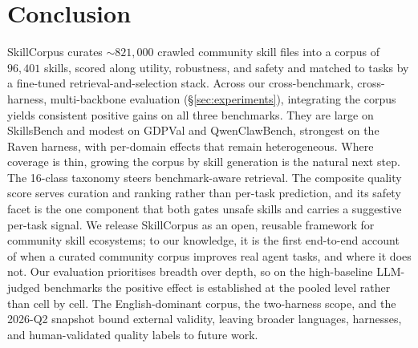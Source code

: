\section{Conclusion}
\label{sec:conclusion}

SkillCorpus curates $\sim$$821{,}000$ crawled community skill files
into a corpus of $96{,}401$ skills, scored along utility,
robustness, and safety and matched to tasks by a fine-tuned
retrieval-and-selection stack.  Across our cross-benchmark,
cross-harness, multi-backbone evaluation
(\S\ref{sec:experiments}), integrating the corpus yields
consistent positive gains on all three benchmarks.  They
are large on SkillsBench and modest on GDPVal and QwenClawBench,
strongest on the Raven harness, with per-domain effects that
remain heterogeneous.  Where coverage is thin, growing the corpus
by skill generation is the natural next step.  The 16-class
taxonomy steers benchmark-aware retrieval.  The composite quality score
serves curation and ranking rather than per-task prediction, and
its safety facet is the one component that both gates unsafe
skills and carries a suggestive per-task signal.  
We release SkillCorpus as an open, reusable framework for community skill ecosystems; to our knowledge, it is the first end-to-end account of when a curated community corpus improves real agent tasks, and where it does not.
\ifarxiv\else
Our evaluation prioritises breadth over depth, so on the
high-baseline LLM-judged benchmarks the positive effect is
established at the pooled level rather than cell by cell.  The
English-dominant corpus, the two-harness scope, and the 2026-Q2
snapshot bound external validity, leaving broader languages,
harnesses, and human-validated quality labels to future work.
\fi
